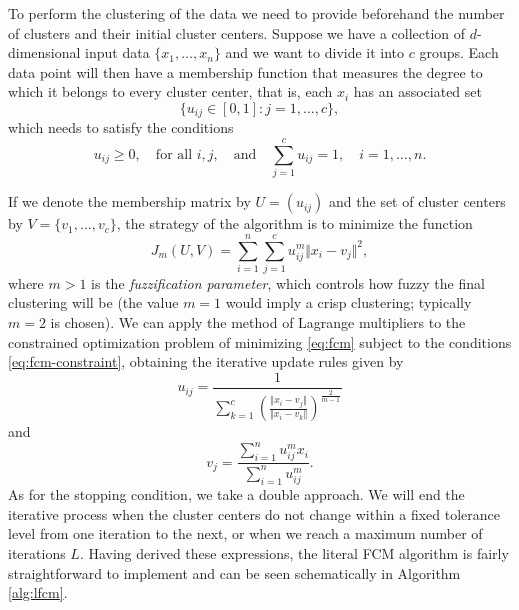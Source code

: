 To perform the clustering of the data we need to provide beforehand the number of clusters and their initial cluster centers. Suppose we have a collection of $d$-dimensional input data $\{x_1,\dots,x_n\}$ and we want to divide it into $c$ groups. Each data point will then have a membership function that measures the degree to which it belongs to every cluster center, that is, each $x_i$ has an associated set
\[
\{u_{ij} \in [0,1]: j=1,\dots,c \},
\]
which needs to satisfy the conditions
\begin{equation} \label{eq:fcm-constraint}
u_{ij}\geq 0, \quad \text{for all } i,j, \quad \text{and} \quad \sum_{j=1}^c u_{ij} = 1, \quad i=1,\dots,n.
\end{equation}

If we denote the membership matrix by $U=(u_{ij})$ and the set of cluster centers by $V=\{v_1,\dots, v_c\}$, the strategy of the algorithm is to minimize the function
\begin{equation} \label{eq:fcm}
J_m(U,V) = \sum_{i=1}^n \sum_{j=1}^c u_{ij}^m \Vert x_i - v_j \Vert ^2,
\end{equation}
where $m > 1$ is the \textit{fuzzification parameter}, which controls how fuzzy the final clustering will be (the value $m=1$ would imply a crisp clustering; typically $m=2$ is chosen). We can apply the method of Lagrange multipliers to the constrained optimization problem of minimizing \eqref{eq:fcm} subject to the conditions \eqref{eq:fcm-constraint}, obtaining the iterative update rules given by
\begin{equation} \label{eq:fcm-update-membership}
  u_{ij}= \dfrac{1}{\displaystyle \sum_{k=1}^c \left( \frac{\Vert x_i - v_j \Vert}{\Vert x_i - v_k \Vert} \right)^{\frac{2}{m-1}}}
\end{equation}
and
\begin{equation} \label{eq:fcm-update-centers}
v_j = \dfrac{\displaystyle\sum_{i=1}^n u_{ij}^m x_i}{\displaystyle\sum_{i=1}^n u_{ij}^m}.
\end{equation}
As for the stopping condition, we take a double approach. We will end the iterative process when the cluster centers do not change within a fixed tolerance level from one iteration to the next, or when we reach a maximum number of iterations $L$. Having derived these expressions, the literal FCM algorithm is fairly straightforward to implement and can be seen schematically in Algorithm \ref{alg:lfcm}.

